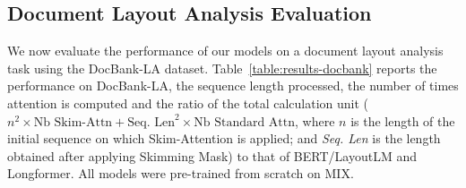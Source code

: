 \subsection{Document Layout Analysis Evaluation}

We now evaluate the performance of our models on a document layout analysis task using the DocBank-LA dataset. Table~\ref{table:results-docbank} reports the performance on DocBank-LA, the sequence length processed, the number of times attention is computed and the ratio of the total calculation unit ($n^2 \times \textrm{Nb Skim-Attn} + \textrm{Seq. Len}^2 \times \textrm{Nb Standard Attn}$, where $n$ is the length of the initial sequence on which Skim-Attention is applied; and \textit{Seq. Len} is the length obtained after applying Skimming Mask) to that of \ac{BERT}/LayoutLM and Longformer. All models were pre-trained from scratch on MIX.

